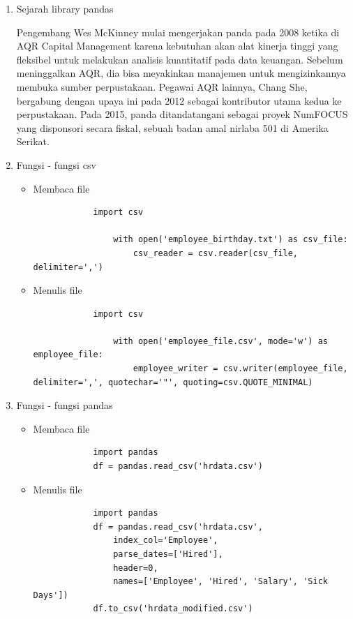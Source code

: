\begin{enumerate}
	\item Sejarah library pandas
		\par Pengembang Wes McKinney mulai mengerjakan panda pada 2008 ketika di AQR Capital Management karena kebutuhan akan alat kinerja tinggi yang fleksibel untuk melakukan analisis kuantitatif pada data keuangan. Sebelum meninggalkan AQR, dia bisa meyakinkan manajemen untuk mengizinkannya membuka sumber perpustakaan. Pegawai AQR lainnya, Chang She, bergabung dengan upaya ini pada 2012 sebagai kontributor utama kedua ke perpustakaan. Pada 2015, panda ditandatangani sebagai proyek NumFOCUS yang disponsori secara fiskal, sebuah badan amal nirlaba 501 di Amerika Serikat.
		
	\item Fungsi - fungsi csv
		\begin{itemize}
			\item Membaca file
			\begin{verbatim}
			import csv

				with open('employee_birthday.txt') as csv_file:
					csv_reader = csv.reader(csv_file, delimiter=',')
			\end{verbatim}
			\item Menulis file 
			\begin{verbatim}
			import csv

				with open('employee_file.csv', mode='w') as employee_file:
					employee_writer = csv.writer(employee_file, delimiter=',', quotechar='"', quoting=csv.QUOTE_MINIMAL)
			\end{verbatim}
		\end{itemize}
	
	\item Fungsi - fungsi pandas 
		\begin{itemize}

		\item Membaca file
			\begin{verbatim}
			import pandas
			df = pandas.read_csv('hrdata.csv')
			\end{verbatim}

			\item Menulis file
			\begin{verbatim}
			import pandas
			df = pandas.read_csv('hrdata.csv', 
				index_col='Employee', 
				parse_dates=['Hired'],
				header=0, 
				names=['Employee', 'Hired', 'Salary', 'Sick Days'])
			df.to_csv('hrdata_modified.csv')	
			\end{verbatim}
		\end{itemize}
\end{enumerate}

